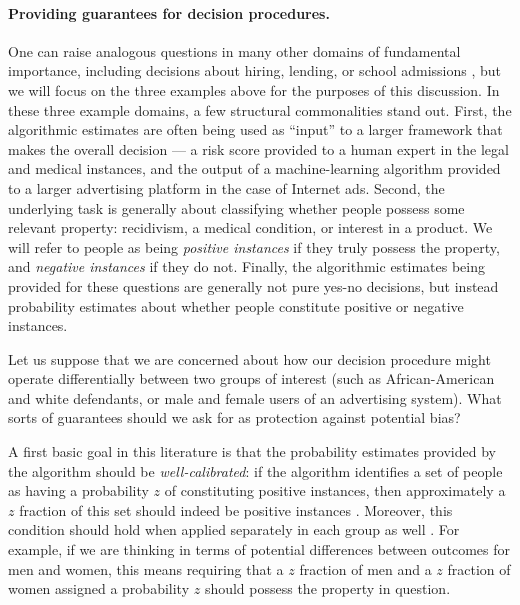 \documentclass[11pt]{article}
\newcommand{\xhdr}[1]{\vspace{-0.2in} \paragraph*{\bf {#1}.}}
\begin{document}
\xhdr{Providing guarantees for decision procedures}
One can raise analogous questions in many other domains of
fundamental importance, including 
decisions about hiring, lending, or school admissions
\cite{whitehouse-big-data}, but we will focus on the three
examples above for the purposes of this discussion.
In these three example domains, a few structural
commonalities stand out. 
First, the algorithmic estimates
are often being used as ``input'' to a larger framework that makes
the overall decision --- a risk score provided to a
human expert in the legal and medical instances, and the output
of a machine-learning algorithm provided to a larger advertising platform
in the case of Internet ads.
Second, the underlying task is generally about classifying whether
people possess some relevant property:
recidivism, a medical condition, or interest in a product.
We will refer to people as being {\em positive instances} if
they truly possess the property, and {\em negative instances} if they do not.
Finally, the algorithmic estimates being provided for these questions
are generally not pure yes-no decisions,
but instead probability estimates about whether people constitute
positive or negative instances.

Let us suppose that we are concerned about how our decision procedure
might operate differentially between two groups of interest (such as
African-American and white defendants, or male and female users of
an advertising system).
What sorts of guarantees should we ask for 
as protection against potential bias?

A first basic goal in this literature is that the probability estimates 
provided by the algorithm should be {\em well-calibrated}:
if the algorithm identifies a set of people as having a probability $z$ of
constituting positive instances,
then approximately a $z$ fraction of this set
should indeed be positive instances
\cite{crowson-calibration-risk-scores,foster-asymptotic-calibration}.
Moreover, this condition should hold when applied separately in each
group as well \cite{flores-re-propublica-fair}. 
For example, if we are thinking in terms of potential differences
between outcomes for men and women, this means requiring that a $z$ fraction
of men and a $z$ fraction of women assigned a probability $z$ should possess
the property in question.
\end{document}
